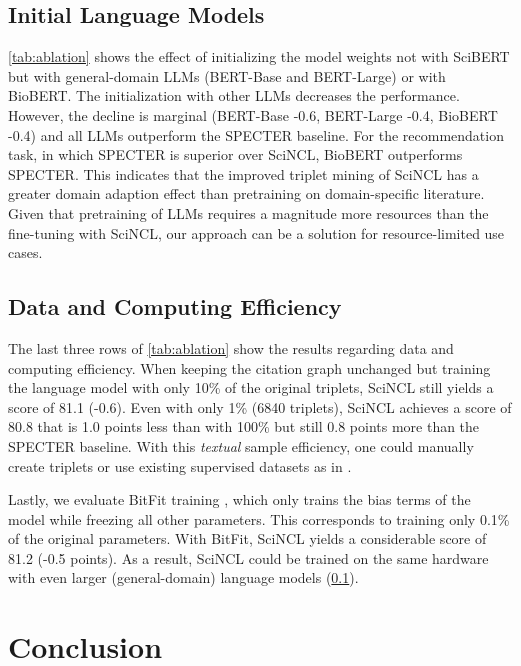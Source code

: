 \documentclass[11pt]{article}
\newcommand{\sys}{SciNCL\xspace} \newcommand{\baselineCount}{10\xspace}
\begin{document}
\subsection{Initial Language Models} \label{ssec:init-lms}

\cref{tab:ablation} shows the effect of initializing the model weights not with SciBERT but with general-domain LLMs (BERT-Base and BERT-Large) or with BioBERT. 
The initialization with other LLMs decreases the performance.
However, the decline is marginal (BERT-Base -0.6, BERT-Large -0.4, BioBERT -0.4) and all LLMs outperform the SPECTER baseline.
For the recommendation task, in which SPECTER is superior over \sys, BioBERT outperforms SPECTER. This indicates that the improved triplet mining of \sys has a greater domain adaption effect than pretraining on domain-specific literature.
Given that pretraining of LLMs requires a magnitude more resources than the fine-tuning with \sys, our approach can be a solution for resource-limited use cases.


\subsection{Data and Computing Efficiency} \label{ssec:data-efficiency} 

The last three rows of \cref{tab:ablation} show the results regarding data and computing efficiency.
When keeping the citation graph unchanged but training the language model with only 10\% of the original triplets, \sys still yields a score of 81.1 (-0.6).
Even with only 1\% (6840 triplets), \sys achieves a score of 80.8 that is 1.0 points less than with 100\% but still 0.8 points more than the SPECTER baseline.
With this \textit{textual} sample efficiency, one could manually create triplets or use existing supervised datasets as in \citet{Gao2021}.



Lastly, we evaluate BitFit training \cite{Zaken2021}, which only trains the bias terms of the model while freezing all other parameters.
This corresponds to training only 0.1\% of the original parameters.
With BitFit, \sys yields a considerable score of 81.2 (-0.5 points).
As a result, \sys could be trained  on the same hardware with even larger (general-domain) language models (\cref{ssec:init-lms}).

\section{Conclusion}
\end{document}
